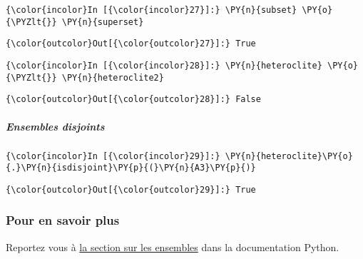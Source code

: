     \begin{Verbatim}[commandchars=\\\{\},frame=single,framerule=0.3mm,rulecolor=\color{cellframecolor}]
{\color{incolor}In [{\color{incolor}27}]:} \PY{n}{subset} \PY{o}{\PYZlt{}} \PY{n}{superset}
\end{Verbatim}


\begin{Verbatim}[commandchars=\\\{\},frame=single,framerule=0.3mm,rulecolor=\color{cellframecolor}]
{\color{outcolor}Out[{\color{outcolor}27}]:} True
\end{Verbatim}
            
    \begin{Verbatim}[commandchars=\\\{\},frame=single,framerule=0.3mm,rulecolor=\color{cellframecolor}]
{\color{incolor}In [{\color{incolor}28}]:} \PY{n}{heteroclite} \PY{o}{\PYZlt{}} \PY{n}{heteroclite2}
\end{Verbatim}


\begin{Verbatim}[commandchars=\\\{\},frame=single,framerule=0.3mm,rulecolor=\color{cellframecolor}]
{\color{outcolor}Out[{\color{outcolor}28}]:} False
\end{Verbatim}
            
    \hypertarget{ensembles-disjoints}{%
\subparagraph{Ensembles disjoints}\label{ensembles-disjoints}}

    \begin{Verbatim}[commandchars=\\\{\},frame=single,framerule=0.3mm,rulecolor=\color{cellframecolor}]
{\color{incolor}In [{\color{incolor}29}]:} \PY{n}{heteroclite}\PY{o}{.}\PY{n}{isdisjoint}\PY{p}{(}\PY{n}{A3}\PY{p}{)}
\end{Verbatim}


\begin{Verbatim}[commandchars=\\\{\},frame=single,framerule=0.3mm,rulecolor=\color{cellframecolor}]
{\color{outcolor}Out[{\color{outcolor}29}]:} True
\end{Verbatim}
            
    \hypertarget{pour-en-savoir-plus}{%
\subsubsection{Pour en savoir plus}\label{pour-en-savoir-plus}}

    Reportez vous à
\href{https://docs.python.org/3/library/stdtypes.html\#set-types-set-frozenset}{la
section sur les ensembles} dans la documentation Python.


    
    
    
